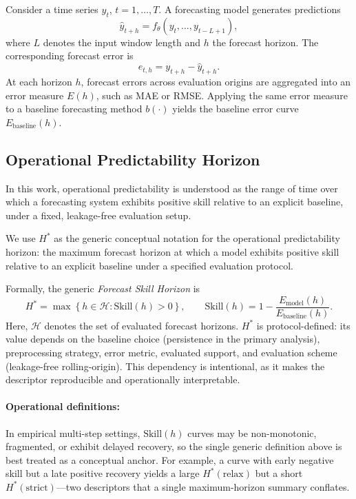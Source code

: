 \documentclass[pdflatex]{sn-jnl}
\begin{document}
Consider a time series $y_t$, $t = 1,\dots,T$.
A forecasting model generates predictions
\begin{equation}
\hat{y}_{t+h} = f_{\theta}(y_t, \dots, y_{t-L+1}),
\end{equation}
where $L$ denotes the input window length and $h$ the forecast horizon.
The corresponding forecast error is
\begin{equation}
e_{t,h} = y_{t+h} - \hat{y}_{t+h}.
\end{equation}
At each horizon $h$, forecast errors across evaluation origins are aggregated
into an error measure $E(h)$, such as MAE or RMSE. Applying the same error
measure to a baseline forecasting method $b(\cdot)$ yields the baseline error
curve $E_{\mathrm{baseline}}(h)$.

\subsection{Operational Predictability Horizon}
In this work, operational predictability is understood as the range of time over which a forecasting system exhibits positive skill relative to an explicit baseline, under a fixed, leakage-free evaluation setup.

We use $H^*$ as the generic conceptual notation for the operational predictability horizon: the maximum forecast horizon at which a model exhibits positive skill relative to an explicit baseline under a specified evaluation protocol.

Formally, the generic \emph{Forecast Skill Horizon} is
\begin{equation}
  H^* = \max \left\{ h \in \mathcal{H} : \mathrm{Skill}(h) > 0 \right\},
  \qquad
  \mathrm{Skill}(h) = 1 - \frac{E_{\mathrm{model}}(h)}{E_{\mathrm{baseline}}(h)}.
\end{equation}
Here, $\mathcal{H}$ denotes the set of evaluated forecast horizons. $H^*$ is protocol-defined: its value depends on the baseline choice (persistence in the primary analysis), preprocessing strategy, error metric, evaluated support, and evaluation scheme (leakage-free rolling-origin). This dependency is intentional, as it makes the descriptor reproducible and operationally interpretable.

\paragraph{Operational definitions:}
In empirical multi-step settings, $\mathrm{Skill}(h)$ curves may be
non-monotonic, fragmented, or exhibit delayed recovery, so the single
generic definition above is best treated as a conceptual anchor.
For example, a curve with early negative skill but a late positive
recovery yields a large $H^*(\mathrm{relax})$ but a short
$H^*(\mathrm{strict})$—two descriptors that a single maximum-horizon
summary conflates.
\end{document}
